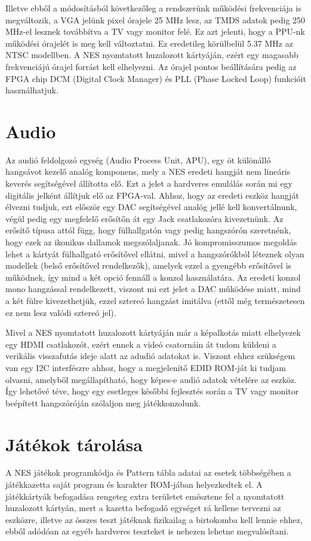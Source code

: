 Illetve ebből a módosításból következőleg a rendszerünk működési frekvenciája is megváltozik, a VGA jelünk pixel órajele 25 MHz lesz, az TMDS adatok pedig 250 MHz-el lesznek továbbítva a TV vagy monitor felé. Ez azt jelenti, hogy a PPU-nk működési órajelét is meg kell változtatni. Ez eredetileg körülbelül 5.37 MHz az NTSC modellben. A NES nyomtatott huzalozott kártyáján, ezért egy magasabb frekvenciájú órajel forrást kell elhelyezni. Az órajel pontos beállítására pedig az FPGA chip DCM (Digital Clock Manager) és PLL (Phase Locked Loop) funkcióit használhatjuk.  

\section{Audio}
Az audió feldolgozó egység (Audio Process Unit, APU), egy öt különálló hangsávot kezelő analóg komponens, mely a NES eredeti hangját nem lineáris keverés segítségével állította elő. Ezt a jelet a hardveres emulálás során mi egy digitális jelként állítjuk elő az FPGA-val. Ahhoz, hogy az eredeti eszköz hangját élvezni tudjuk, ezt először egy DAC segítségével analóg jellé kell konvertálnunk, végül pedig egy megfelelő erősítőn át egy Jack csatlakozóra kivezetnünk. Az erősítő típusa attól függ, hogy fülhallgatón vagy pedig hangszórón szeretnénk, hogy ezek az ikonikus dallamok megszólaljanak. Jó kompromisszumos megoldás lehet a kártyát fülhallgató erősítővel ellátni, mivel a hangszórókból léteznek olyan modellek (belső erősítővel rendelkezők), amelyek ezzel a gyengébb erősítővel is működnek, így mind a két opció fennáll a konzol használatára. Az eredeti konzol mono hangzással rendelkezett, viszont mi ezt jelet a DAC működése miatt, mind a két fülre kivezethetjük, ezzel sztereó hangzást imitálva (ettől még természetesen ez nem lesz valódi sztereó jel).   

Mivel a NES nyomtatott huzalozott kártyáján már a képalkotás miatt elhelyezek egy HDMI csatlakozót, ezért ennek a videó csatornáin át tudom küldeni a verikális visszafutás ideje alatt az adudió adatokat is. Viszont ehhez szükségem van egy I2C interfészre ahhoz, hogy a megjelenítő EDID ROM-ját ki tudjam olvasni, amelyből megállapítható, hogy képes-e audió adatok vételére az eszköz. Így lehetővé téve, hogy egy esetleges későbbi fejlesztés során a TV vagy monitor beépített hangszóróján szólaljon meg játékkonzolunk. 

\section{Játékok tárolása}
\label{sec:Game-store}
A NES játékok programkódja és Pattern tábla adatai az esetek többségében a játékkazetta saját program és karakter ROM-jában helyezkedtek el. A játékkártyák befogadása rengeteg extra területet emésztene fel a nyomtatott huzalozott kártyán, mert a kazetta befogadó egységet rá kellene tervezni az eszközre, illetve az összes teszt játéknak fizikailag a birtokomba kell lennie ehhez, ebből adódóan az egyéb hardveres teszteket is nehezen lehetne megvalósítani. 

